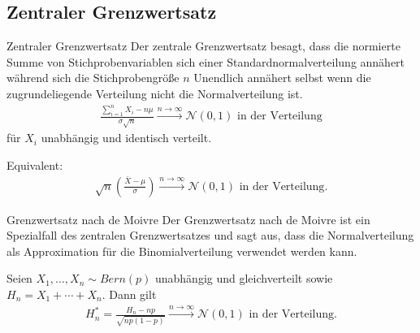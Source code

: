 \documentclass{beamer}
\def\spadding{\vspace{0.25cm}}
\begin{document}
\subsection{Zentraler Grenzwertsatz}
\begin{frame}{Zentraler Grenzwertsatz}
    Der zentrale Grenzwertsatz besagt, dass die normierte Summe von Stichprobenvariablen sich einer Standardnormalverteilung annähert  während sich die Stichprobengröße $n$ Unendlich annähert selbst wenn die zugrundeliegende Verteilung nicht die Normalverteilung ist.\pause
    \begin{align*}
        \frac{\sum_{i=1}^n X_i - n \mu}{\sigma \sqrt{n}} \xrightarrow{n \to \infty} \mathcal{N}(0,1) \text{ in der Verteilung}
    \end{align*}
    für $X_i$ unabhängig und identisch verteilt.\pause\par\spadding
    Equivalent:
    \begin{align*}
        \sqrt{n} \left(\frac{\bar{X} - \mu}{\sigma}\right) \xrightarrow{n \to \infty} \mathcal{N}(0,1) \text{ in der Verteilung}.
    \end{align*}
\end{frame}

\begin{frame}
    \begin{block}{Grenzwertsatz nach de Moivre}
        Der Grenzwertsatz nach de Moivre ist ein Spezialfall des zentralen Grenzwertsatzes und sagt aus, dass die Normalverteilung als Approximation für die Binomialverteilung verwendet werden kann.\pause\par\spadding
        Seien $X_1, \dots, X_n \sim Bern(p)$ unabhängig und gleichverteilt sowie $H_n = X_1 + \cdots + X_n$. Dann gilt
        \begin{align*}
            H_n^* = \frac{H_n - n p}{\sqrt{n p (1 - p)}} \xrightarrow{n \to \infty} \mathcal{N}(0,1) \text{ in der Verteilung}.
        \end{align*}
    \end{block}
\end{frame}
\end{document}
